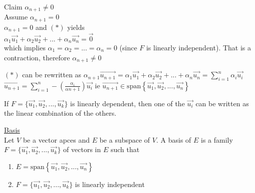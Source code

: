\documentclass[12pt]{article}
\renewcommand{\v}[1]{\overrightarrow{#1}}
\newcommand{\vectorset}[1]{\{\v{#1_1}, \v{#1_2}, ..., \v{#1_k}\}}
\newenvironment{proposition}{\block[Proposition]}{\endblock}
\newcommand{\bb}[1]{\left\{#1\right\}}
\newcommand{\pp}[1]{\left(#1\right)}
\newcommand{\sspan}[1]{\text{span}\bb{#1}}
\begin{document}
\begin{itemize}
		Claim $\alpha_{n+1} \ne 0$ \\
		Assume $\alpha_{n+1} = 0$ \\
		$\alpha_{n+1} = 0$ and $(*)$ yields \\
		$\alpha_1 \v{u_1} + \alpha_2 \v{u_2} + ... + \alpha_n \v{u_n} = \v{0}$ \\
		which implies $\alpha_1 = \alpha_2 = ... = \alpha_n = 0$ (since $F$ is linearly independent). That is a contraction, therefore $\alpha_{n+1} \ne 0$
		
		$(*)$ can be rewritten as $\alpha_{n+1} \v{u_{n+1}} = \alpha_1 \v{u_1} + \alpha_2 \v{u_2} + ... + \alpha_n \v{u_n} = \sum_{i=1}^n \alpha_i \v{u_i}$ \\
		$\v{u_{n+1}} = \sum_{i=1}^n -\pp{\frac{\alpha_i}{\alpha{n+1}}} \v{u_i}$ \qquad ie $\v{u_{n+1}} \in \sspan{\v{u_1}, \v{u_2}, ..., \v{u_n}}$
	\end{itemize}
	
	\begin{proposition}
		If $F = \vectorset{u}$ is linearly dependent, then one of the $\v{u_i}$ can be written as the linear combination of the others.
	\end{proposition}
	
	\underline{Basis} \\
	Let $V$ be a vector apces and $E$ be a subspace of $V$. A basis of $E$ is a family $F = \vectorset{u}$ of vectors in $E$ such that
	
	\begin{enumerate}
		\item $E = \sspan{\v{u_1}, \v{u_2}, ..., \v{u_n}}$
		\item $F = \vectorset{u}$ is linearly independent
	\end{enumerate} 
	
\end{document}
